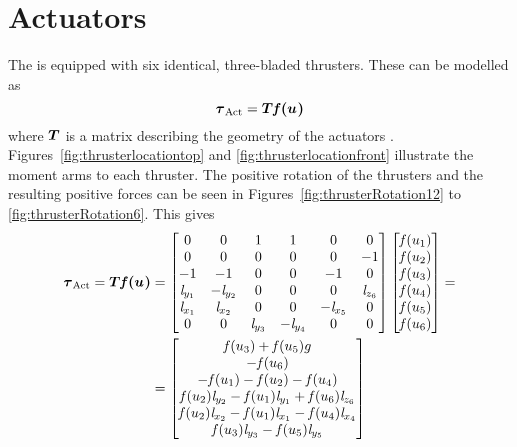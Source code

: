 \section{Actuators}\label{sec:act}   
The \abbrROV is equipped with six identical, three-bladed thrusters. These can be modelled as
\begin{equation}\label{eq:act}
    \boldsymbol{\tau}_{\text{Act}} = \boldsymbol{T} \boldsymbol{\mathit{f}(u_{})} 
\end{equation}
where $\boldsymbol{T}$ is a matrix describing the geometry of the actuators \citep[p. 401]{fossen2011}. Figures~\ref{fig:thrusterlocationtop} and \ref{fig:thrusterlocationfront} illustrate the moment arms to each thruster. The positive rotation of the thrusters and the resulting positive forces can be seen in Figures~\ref{fig:thrusterRotation12} to \ref{fig:thrusterRotation6}. This gives
\begin{align}\label{eq:actuatorGeometry}
\begin{split}
    \boldsymbol{\tau}_{\text{Act}} = \boldsymbol{T} \boldsymbol{\mathit{f}(u_{})} 
    &=
    \begin{bmatrix}
    0& 0& 1& 1& 0& 0\\
    0& 0& 0&  0& 0& -1\\
    -1& -1& 0& 0& -1& 0\\
    \mathit{l}_{y_{1}} & -\mathit{l}_{y_{2}} & 0 &  0 &  0 & \mathit{l}_{z_{6}} \\
    \mathit{l}_{x_{1}} & \mathit{l}_{x_{2}} & 0 & 0 & -\mathit{l}_{x_{5}} & 0 \\
    0 & 0 & \mathit{l}_{y_{3}} & -\mathit{l}_{y_{4}} & 0 & 0 \\
    \end{bmatrix}
    \begin{bmatrix}
    \mathit{f}(u_{1}) \\
    \mathit{f}(u_{2}) \\
    \mathit{f}(u_{3}) \\
    \mathit{f}(u_{4}) \\
    \mathit{f}(u_{5}) \\
    \mathit{f}(u_{6}) \\
    \end{bmatrix}
    = \\
    &=\begin{bmatrix}
     \mathit{f}(u_{3}) + \mathit{f}(u_{5}) g \\
     -\mathit{f}(u_{6}) \\
     -\mathit{f}(u_{1}) - \mathit{f}(u_{2}) - \mathit{f}(u_{4}) \\
    \mathit{f}(u_{2}) \mathit{l}_{y_{2}} - \mathit{f}(u_{1}) \mathit{l}_{y_{1}} + \mathit{f}(u_{6}) \mathit{l}_{z_{6}} \\
    \mathit{f}(u_{2}) \mathit{l}_{x_{2}} - \mathit{f}(u_{1}) \mathit{l}_{x_{1}} - \mathit{f}(u_{4}) \mathit{l}_{x_{4}} \\
    \mathit{f}(u_{3}) \mathit{l}_{y_{3}} - \mathit{f}(u_{5}) \mathit{l}_{y_{5}} \\
    \end{bmatrix}
\end{split}
\end{align}
